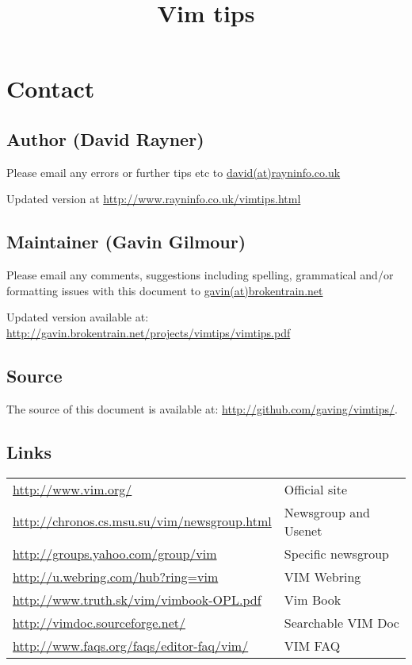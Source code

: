 \documentclass[10pt]{article}
\begin{document}
\title{Vim tips}

\maketitle
\tableofcontents
\newpage







\section{Contact}

\subsection{Author (David Rayner)}
Please email any errors or further tips etc to \href{mailto:david@rayninfo.co.uk}{david(at)rayninfo.co.uk}

Updated version at \url{http://www.rayninfo.co.uk/vimtips.html}

\subsection{Maintainer (Gavin Gilmour)}
Please email any comments, suggestions including spelling, grammatical and/or
formatting issues with this document to 
\href{mailto:gavin@brokentrain.net}{gavin(at)brokentrain.net}

Updated version available at: \url{http://gavin.brokentrain.net/projects/vimtips/vimtips.pdf}

\subsection{Source}
The source of this document is available at:
\url{http://github.com/gaving/vimtips/}.

\subsection{Links}
\begin{longtable}{l|l}
    \url{http://www.vim.org/} & Official site\\
    \url{http://chronos.cs.msu.su/vim/newsgroup.html} & Newsgroup and Usenet\\
    \url{http://groups.yahoo.com/group/vim} & Specific newsgroup\\
    \url{http://u.webring.com/hub?ring=vim} & VIM Webring\\
    \url{http://www.truth.sk/vim/vimbook-OPL.pdf} & Vim Book\\
    \url{http://vimdoc.sourceforge.net/} & Searchable VIM Doc\\
    \url{http://www.faqs.org/faqs/editor-faq/vim/} & VIM FAQ\\
\end{longtable}
\end{document}
